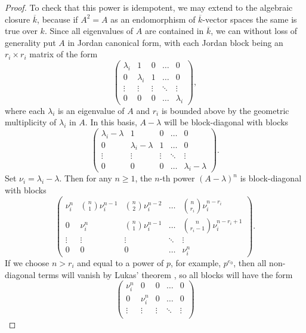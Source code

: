 \documentclass[12pt]{amsart}
\let\bar\overline
\theoremstyle{theorem}
\numberwithin{thm}{section}
\theoremstyle{definition}
\begin{document}
\begin{proof}
To check that this power is idempotent, we may extend to the algebraic closure $\bar k$, because if $A^2=A$ as an endomorphism of $\bar k$-vector spaces the same is true over $k$.
  Since all eigenvalues of $A$ are contained in $\bar k$, we can without loss of generality put $A$ in Jordan canonical form, with each Jordan block being an $r_i\times r_i$ matrix of the form
  \[ \begin{pmatrix}
        \lambda_i & 1 & 0 & \dots & 0 \\
        0 & \lambda_i & 1  & \dots & 0 \\
        \vdots & \vdots & \vdots & \ddots & \vdots \\
        0 & 0 & 0 & \dots & \lambda_i
    \end{pmatrix}, \]
  where each $\lambda_i$ is an eigenvalue of $A$ and $r_i$ is bounded above by the geometric multiplicity of $\lambda_i$ in $A$.
  In this basis, $A-\lambda$ will be block-diagonal with blocks
  \[ \begin{pmatrix}
    \lambda_i-\lambda & 1 & 0 & \dots & 0 \\
    0 & \lambda_i-\lambda & 1 & \dots & 0 \\
    \vdots & \vdots & \vdots & \ddots & \vdots \\
    0 & 0 & 0 & \dots & \lambda_i-\lambda
  \end{pmatrix}. \]
  Set $\nu_i=\lambda_i-\lambda$. Then for any $n\geq 1$,
  the $n$-th power $(A-\lambda)^n$ is block-diagonal with blocks
  \[ \begin{pmatrix}
    \nu_i^n & \binom{n}1\nu_i^{n-1} & \binom{n}2\nu_i^{n-2} & \dots & \binom{n}{r_i}\nu_i^{n-r_i} \\
    0 & \nu_i^n & \binom{n}1\nu_i^{n-1} & \dots & \binom{n}{r_i-1}\nu_i^{n-r_i+1} \\
    \vdots & \vdots & \vdots & \ddots & \vdots \\
    0 & 0 & 0 & \dots & \nu_i^n
  \end{pmatrix}. \]
  If we choose $n > r_i$ and equal to a power of $p$, for example, $p^{e_0}$, then all non-diagonal terms will vanish by Lukas' theorem \cite[Lemma~15.22]{Eisenbud95}, so all blocks will have the form
  \[ \begin{pmatrix}
    \nu_i^n & 0 & 0 & \dots & 0 \\
    0 & \nu_i^n & 0 & \dots & 0 \\
    \vdots & \vdots & \vdots & \ddots & \vdots \\

\end{pmatrix}\]
\end{proof}
\end{document}
